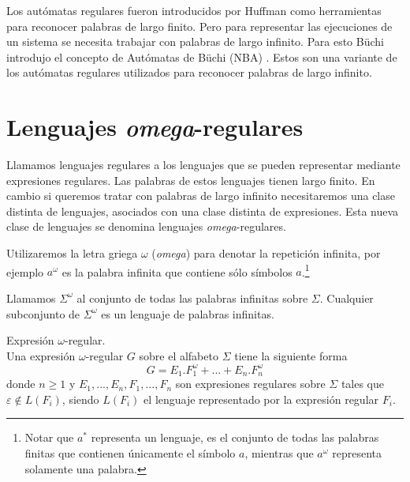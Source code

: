 Los autómatas regulares fueron introducidos por Huffman \cite{huffman} como
 herramientas para reconocer palabras de largo finito.
Pero para representar las ejecuciones de un sistema se necesita trabajar con palabras de largo infinito.
Para esto Büchi introdujo el concepto de Autómatas de Büchi (NBA) \cite{buchi}.
Estos son una variante de los autómatas
 regulares utilizados para reconocer palabras de largo infinito.



\section{Lenguajes \textit{omega}-regulares}
Llamamos lenguajes regulares a los lenguajes que se pueden representar mediante expresiones regulares.
Las palabras de estos lenguajes tienen largo finito.
 En cambio si queremos tratar con palabras de largo infinito necesitaremos una clase distinta de
 lenguajes, asociados con una clase distinta de expresiones. Esta nueva clase de lenguajes se denomina
 lenguajes \textit{omega}-regulares.
 
Utilizaremos la letra griega $\omega$ (\textit{omega}) para denotar la repetición infinita,
 por ejemplo $a^\omega$ es la palabra
 infinita que contiene sólo símbolos $a$.\footnote{Notar que $a^*$ representa un lenguaje, es el conjunto de todas las palabras finitas que contienen únicamente el símbolo $a$, mientras que $a^\omega$ representa
 solamente una palabra.}
 
Llamamos $\Sigma^\omega$ al conjunto de todas las palabras infinitas sobre $\Sigma$.
 Cualquier subconjunto de $\Sigma^\omega$ es un lenguaje de palabras infinitas.

\begin{definicion}
Expresión $\omega$-regular.\\
Una expresión $\omega$-regular $G$ sobre el alfabeto $\Sigma$ tiene la siguiente forma
\[ G = E_1.F_1^\omega + ... + E_n.F_n^\omega \]
donde $n \geq 1$ y $E_1, ..., E_n, F_1, ..., F_n$ son expresiones regulares sobre $\Sigma$ tales que
 $\varepsilon \not\in L(F_i)$, siendo $L(F_i)$ el lenguaje representado por la expresión regular $F_i$.
\end{definicion}


